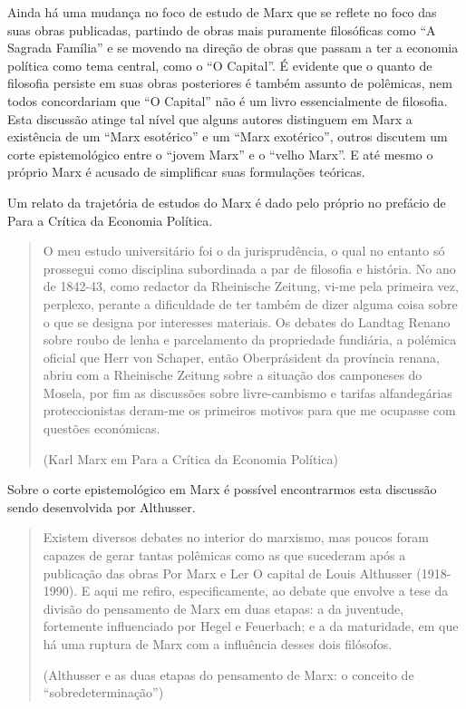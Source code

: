 Ainda há uma mudança no foco de estudo de Marx que se reflete no foco das suas obras publicadas, partindo de obras mais puramente filosóficas como “A Sagrada Família” e se movendo na direção de obras que passam a ter a economia política como tema central, como o “O Capital”. É evidente que o quanto de filosofia persiste em suas obras posteriores é também assunto de polêmicas, nem todos concordariam que “O Capital” não é um livro essencialmente de filosofia. Esta discussão atinge tal nível que alguns autores distinguem em Marx a existência de um “Marx esotérico” e um “Marx exotérico”, outros discutem um corte epistemológico entre o “jovem Marx” e o “velho Marx”. E até mesmo o próprio Marx é acusado de simplificar suas formulações teóricas.

Um relato da trajetória de estudos do Marx é dado pelo próprio no prefácio de Para a Crítica da Economia Política.

\begin{quote}
O meu estudo universitário foi o da jurisprudência, o qual no entanto só prossegui como disciplina subordinada a par de filosofia e história. No ano de 1842-43, como redactor da Rheinische Zeitung, vi-me pela primeira vez, perplexo, perante a dificuldade de ter também de dizer alguma coisa sobre o que se designa por interesses materiais. Os debates do Landtag Renano sobre roubo de lenha e parcelamento da propriedade fundiária, a polémica oficial que Herr von Schaper, então Oberprásident da província renana, abriu com a Rheinische Zeitung sobre a situação dos camponeses do Mosela, por fim as discussões sobre livre-cambismo e tarifas alfandegárias proteccionistas deram-me os primeiros motivos para que me ocupasse com questões económicas.

(Karl Marx em Para a Crítica da Economia Política)
\end{quote}

Sobre o corte epistemológico em Marx é possível encontrarmos esta discussão sendo desenvolvida por Althusser.

\begin{quote}
Existem diversos debates no interior do marxismo, mas poucos foram capazes de gerar tantas polêmicas como as que sucederam após a publicação das obras Por Marx e Ler O capital de Louis Althusser (1918-1990). E aqui me refiro, especificamente, ao debate que envolve a tese da divisão do pensamento de Marx em duas etapas: a da juventude, fortemente influenciado por Hegel e Feuerbach; e a da maturidade, em que há uma ruptura de Marx com a influência desses dois filósofos.

(Althusser e as duas etapas do pensamento de Marx: o conceito de “sobredeterminação”)
\end{quote}

